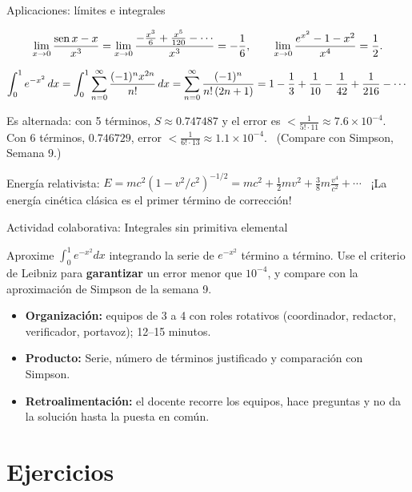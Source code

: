 \documentclass[10pt,aspectratio=169]{beamer}
\begin{document}
\begin{frame}{Aplicaciones: límites e integrales}
  \begin{ejemplo}[8: límites]
    \[ \lim_{x\to0}\frac{\operatorname{sen} x-x}{x^3}=\lim_{x\to0}\frac{-\frac{x^3}{6}+\frac{x^5}{120}-\cdots}{x^3}=-\frac16,\qquad
       \lim_{x\to0}\frac{e^{x^2}-1-x^2}{x^4}=\frac12. \]
  \end{ejemplo}
  \begin{ejemplo}
    $\displaystyle\int_0^1e^{-x^2}\,dx=\int_0^1\sum_{n=0}^\infty\frac{(-1)^nx^{2n}}{n!}\,dx=\sum_{n=0}^\infty\frac{(-1)^n}{n!\,(2n+1)}
      =1-\frac13+\frac1{10}-\frac1{42}+\frac1{216}-\cdots$
    \smallskip

    Es alternada: con 5 términos, $S\approx0.747487$ y el error es $<\frac1{5!\cdot11}\approx7.6\times10^{-4}$.
    Con 6 términos, $0.746729$, error $<\frac1{6!\cdot13}\approx1.1\times10^{-4}$. \ (Compare con Simpson, Semana 9.)
  \end{ejemplo}
  \begin{ejemplo}[10: física]
    Energía relativista: $E=mc^2(1-v^2/c^2)^{-1/2}=mc^2+\frac12mv^2+\frac38m\frac{v^4}{c^2}+\cdots$ \
    ¡La energía cinética clásica es el primer término de corrección!
  \end{ejemplo}
\end{frame}

\begin{frame}{Actividad colaborativa: Integrales sin primitiva elemental}
  \small
  \begin{activa}
    Aproxime $\int_0^1e^{-x^2}dx$ integrando la serie de $e^{-x^2}$ término a término. Use el criterio de Leibniz para \textbf{garantizar} un error menor que $10^{-4}$, y compare con la aproximación de Simpson de la semana 9.
  \end{activa}
  \begin{itemize}
    \item \textbf{Organización:} equipos de 3 a 4 con roles rotativos (coordinador, redactor, verificador, portavoz); 12--15 minutos.
    \item \textbf{Producto:} Serie, número de términos justificado y comparación con Simpson.
    \item \textbf{Retroalimentación:} el docente recorre los equipos, hace preguntas y no da la solución hasta la puesta en común.
  \end{itemize}
\end{frame}

\section{Ejercicios}
\end{document}
